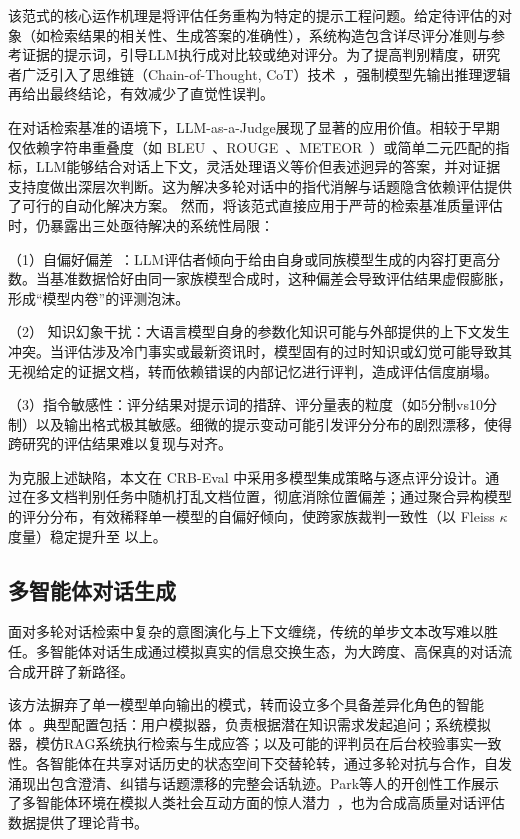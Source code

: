 该范式的核心运作机理是将评估任务重构为特定的提示工程问题。给定待评估的对象（如检索结果的相关性、生成答案的准确性），系统构造包含详尽评分准则与参考证据的提示词，引导LLM执行成对比较或绝对评分。为了提高判别精度，研究者广泛引入了思维链（Chain-of-Thought, CoT）技术~\citep{wei2022chain}，强制模型先输出推理逻辑再给出最终结论，有效减少了直觉性误判。

在对话检索基准的语境下，LLM-as-a-Judge展现了显著的应用价值。相较于早期仅依赖字符串重叠度（如 BLEU~\citep{papineni2002bleu}、ROUGE~\citep{lin2004rouge}、METEOR~\citep{banerjee2005meteor}）或简单二元匹配的指标，LLM能够结合对话上下文，灵活处理语义等价但表述迥异的答案，并对证据支持度做出深层次判断。这为解决多轮对话中的指代消解与话题隐含依赖评估提供了可行的自动化解决方案。
然而，将该范式直接应用于严苛的检索基准质量评估时，仍暴露出三处亟待解决的系统性局限：

（1）自偏好偏差~\citep{panickssery2024llm}：LLM评估者倾向于给由自身或同族模型生成的内容打更高分数。当基准数据恰好由同一家族模型合成时，这种偏差会导致评估结果虚假膨胀，形成“模型内卷”的评测泡沫。

（2） 知识幻象干扰：大语言模型自身的参数化知识可能与外部提供的上下文发生冲突。当评估涉及冷门事实或最新资讯时，模型固有的过时知识或幻觉可能导致其无视给定的证据文档，转而依赖错误的内部记忆进行评判，造成评估信度崩塌。

（3）指令敏感性：评分结果对提示词的措辞、评分量表的粒度（如5分制vs10分制）以及输出格式极其敏感。细微的提示变动可能引发评分分布的剧烈漂移，使得跨研究的评估结果难以复现与对齐。

为克服上述缺陷，本文在 CRB-Eval 中采用多模型集成策略与逐点评分设计。通过在多文档判别任务中随机打乱文档位置，彻底消除位置偏差；通过聚合异构模型的评分分布，有效稀释单一模型的自偏好倾向，使跨家族裁判一致性（以 Fleiss $\kappa$ 度量）稳定提升至  以上。


\subsection{多智能体对话生成}
面对多轮对话检索中复杂的意图演化与上下文缠绕，传统的单步文本改写难以胜任。多智能体对话生成通过模拟真实的信息交换生态，为大跨度、高保真的对话流合成开辟了新路径。

该方法摒弃了单一模型单向输出的模式，转而设立多个具备差异化角色的智能体~\citep{wang2024survey}。典型配置包括：用户模拟器，负责根据潜在知识需求发起追问；系统模拟器，模仿RAG系统执行检索与生成应答；以及可能的评判员在后台校验事实一致性。各智能体在共享对话历史的状态空间下交替轮转，通过多轮对抗与合作，自发涌现出包含澄清、纠错与话题漂移的完整会话轨迹。Park等人的开创性工作展示了多智能体环境在模拟人类社会互动方面的惊人潜力~\citep{Park2023GenerativeAI}，也为合成高质量对话评估数据提供了理论背书。


